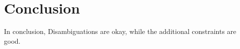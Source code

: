 \chapter{Conclusion}
In conclusion, Disambiguations are okay, while the additional constraints are good.